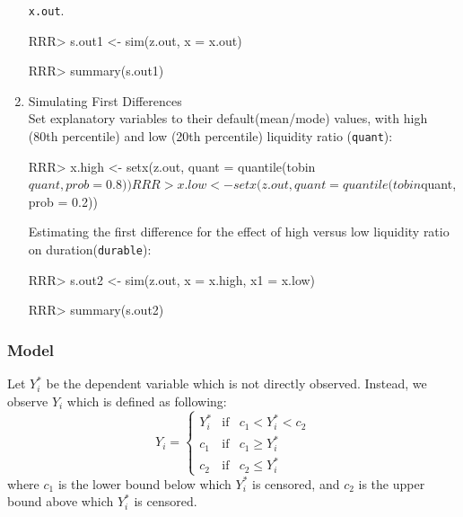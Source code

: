 \begin{enumerate}
\texttt{x.out}.
\begin{Schunk}
\begin{Sinput}
RRR>  s.out1 <- sim(z.out, x = x.out)
\end{Sinput}
\end{Schunk}
\begin{Schunk}
\begin{Sinput}
RRR> summary(s.out1)
\end{Sinput}
\end{Schunk}
\item {Simulating First Differences} \\
Set explanatory variables to their default(mean/mode) values, with high
(80th percentile) and low (20th percentile) liquidity ratio (\texttt{quant}):

\begin{Schunk}
\begin{Sinput}
RRR>  x.high <- setx(z.out, quant = quantile(tobin$quant, prob = 0.8))
RRR>  x.low <- setx(z.out, quant = quantile(tobin$quant, prob = 0.2))
\end{Sinput}
\end{Schunk}
Estimating the first difference for the effect of
high versus low liquidity ratio on duration(\texttt{durable}):
\begin{Schunk}
\begin{Sinput}
RRR>  s.out2 <- sim(z.out, x = x.high, x1 = x.low)
\end{Sinput}
\end{Schunk}
\begin{Schunk}
\begin{Sinput}
RRR> summary(s.out2)
\end{Sinput}
\end{Schunk}
\end{enumerate}

\subsubsection{Model}
Let $Y_i^*$ be the dependent variable which is not directly observed. Instead,
we observe $Y_i$ which is defined as following:
\begin{equation*}
Y_i = \left\{
\begin{array}{lcl}
Y_i^*  &\textrm{if} & c_1<Y_i^*<c_2 \\
c_1    &\textrm{if} & c_1 \ge Y_i^* \\
c_2    &\textrm{if} & c_2 \le Y_i^*
\end{array}\right.
\end{equation*}
where $c_1$ is the lower bound below which $Y_i^*$ is censored, and
$c_2$ is the upper bound above which $Y_i^*$ is censored.

